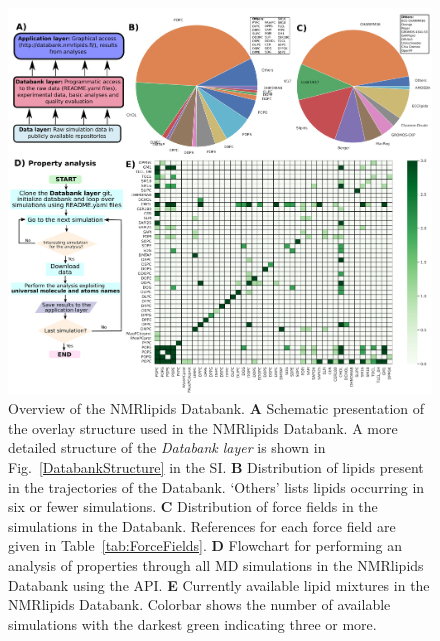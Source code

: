 \documentclass[fleqn,10pt]{wlscirep}
\begin{document}
\begin{figure}[tp]
    \centering
    \includegraphics[width=\linewidth]{Figures/overlay4.pdf}
    \caption{Overview of the NMRlipids Databank. 
    \textbf{A} Schematic presentation of the overlay structure used in the NMRlipids Databank. A more detailed structure of the \textit{Databank layer} is shown in Fig.~\ref{DatabankStructure} in the SI.
    \textbf{B} Distribution of lipids present in the trajectories of the Databank. `Others' lists lipids occurring in six or fewer simulations. 
    \textbf{C} Distribution of force fields in the simulations in the Databank. References for each force field are given in Table~\ref{tab:ForceFields}.
    \textbf{D} Flowchart for performing an analysis of properties through all MD simulations in the NMRlipids Databank using the API.
    \textbf{E} Currently available lipid mixtures in the NMRlipids Databank. Colorbar shows the number of available simulations with the darkest green indicating three or more.  
    }
    \label{fig:overlay}
\end{figure}
\end{document}
